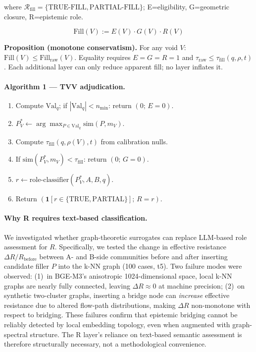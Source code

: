\documentclass[11pt,twocolumn]{article}
\newcommand{\valq}{\mathrm{Val}_{q}}
\newcommand{\taufill}{\tau_{\mathrm{fill}}}
\begin{document}
\noindent where $\mathcal{R}_\mathrm{fill}{=}\{\mathrm{TRUE\text{-}FILL},\mathrm{PARTIAL\text{-}FILL}\}$;
E=eligibility, G=geometric closure, R=epistemic role.

\begin{equation}
\mathrm{Fill}(V) := E(V)\cdot G(V)\cdot R(V)
\end{equation}

\noindent\textbf{Proposition (monotone conservatism).}
For any void $V$: $\mathrm{Fill}(V) \le \mathrm{Fill}_{\mathrm{raw}}(V)$.
Equality requires $E{=}G{=}R{=}1$ and $\tau_{\mathrm{raw}} \le \taufill(q,\rho,t)$.
Each additional layer can only reduce apparent fill; no layer inflates it.

\paragraph{Algorithm 1 — TVV adjudication.}
\begin{enumerate}[nosep,label=\arabic*:]
\item Compute $\valq$; if $|\valq| < n_{\min}$: return $(0;\,E{=}0)$.
\item $P_V^* \leftarrow \arg\max_{P\in\valq}\mathrm{sim}(P,m_V)$.
\item Compute $\taufill(q,\rho(V),t)$ from calibration nulls.
\item If $\mathrm{sim}(P_V^*, m_V) < \taufill$: return $(0;\,G{=}0)$.
\item $r \leftarrow \mathrm{role\text{-}classifier}(P_V^*,A,B,q)$.
\item Return $(\mathbf{1}[r\in\{\mathrm{TRUE},\mathrm{PARTIAL}\}];\,R{=}r)$.
\end{enumerate}

\paragraph{Why R requires text-based classification.}
We investigated whether graph-theoretic surrogates can replace LLM-based role
assessment for $R$. Specifically, we tested the change in effective resistance
$\Delta R/R_{\mathrm{before}}$ between A- and B-side communities before and after
inserting candidate filler $P$ into the k-NN graph (100 cases, t5).
Two failure modes were observed: (1)~in BGE-M3's anisotropic 1024-dimensional space,
local k-NN graphs are nearly fully connected, leaving $\Delta R \approx 0$ at machine
precision; (2)~on synthetic two-cluster graphs, inserting a bridge node can
\emph{increase} effective resistance due to altered flow-path distributions, making
$\Delta R$ non-monotone with respect to bridging.
These failures confirm that epistemic bridging cannot be reliably detected by local
embedding topology, even when augmented with graph-spectral structure. The R layer's
reliance on text-based semantic assessment is therefore structurally necessary, not a
methodological convenience.
\end{document}
